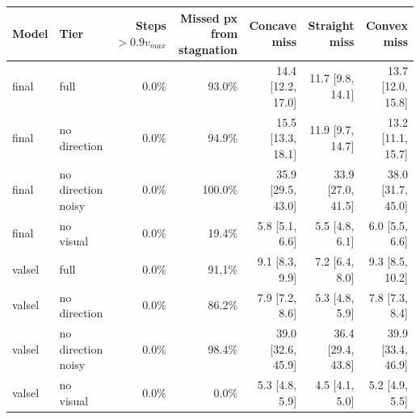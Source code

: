\begin{tabular}{llrrrrr}
\toprule
Model & Tier & Steps $>0.9v_{max}$ & Missed px from stagnation & Concave miss & Straight miss & Convex miss \\
\midrule
final & full & 0.0\% & 93.0\% & 14.4 [12.2, 17.0] & 11.7 [9.8, 14.1] & 13.7 [12.0, 15.8] \\
final & no direction & 0.0\% & 94.9\% & 15.5 [13.3, 18.1] & 11.9 [9.7, 14.7] & 13.2 [11.1, 15.7] \\
final & no direction noisy & 0.0\% & 100.0\% & 35.9 [29.5, 43.0] & 33.9 [27.0, 41.5] & 38.0 [31.7, 45.0] \\
final & no visual & 0.0\% & 19.4\% & 5.8 [5.1, 6.6] & 5.5 [4.8, 6.1] & 6.0 [5.5, 6.6] \\
valsel & full & 0.0\% & 91.1\% & 9.1 [8.3, 9.9] & 7.2 [6.4, 8.0] & 9.3 [8.5, 10.2] \\
valsel & no direction & 0.0\% & 86.2\% & 7.9 [7.2, 8.6] & 5.3 [4.8, 5.9] & 7.8 [7.3, 8.4] \\
valsel & no direction noisy & 0.0\% & 98.4\% & 39.0 [32.6, 45.9] & 36.4 [29.4, 43.8] & 39.9 [33.4, 46.9] \\
valsel & no visual & 0.0\% & 0.0\% & 5.3 [4.8, 5.9] & 4.5 [4.1, 5.0] & 5.2 [4.9, 5.5] \\
\bottomrule
\end{tabular}